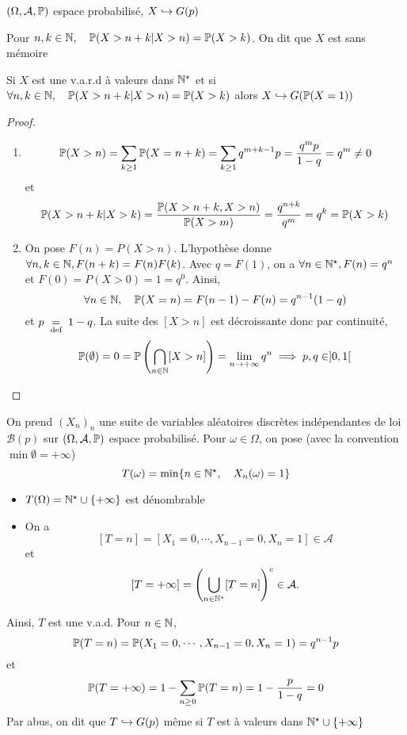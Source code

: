 \begin{thm}
    \Hyp $(\Omega, \mathcal A, \P)$ espace probabilisé, $X\suit G(p)$
     \begin{concenum}
     \item Pour $n,k\in \N,\quad \P(X>n+k|X>n)=\P(X>k)$. On dit que $X$ est sans mémoire
     \item Si $X$ est une v.a.r.d à valeurs dans $\N^\star$ et si $\forall  n,k\in \N,\quad \P(X>n+k|X>n)=\P(X>k)$ alors $X\suit G(\P(X=1))$
    \end{concenum}
\end{thm}

\begin{proof}~
\begin{enumerate}
    \item \[
            \P(X>n)=\sum_{k\geq 1}\P(X=n+k)=\sum_{k\geq 1}q^{m+k-1}p= \frac{q^mp}{1-q}=q^m \neq 0
    \] et \[
    \P(X>n+k|X>k)= \frac{\P(X>n+k,X>n)}{\P(X>m)}=\frac{q^{n+k}}{q^m}=q^k=\P(X>k)
    \] 
\item On pose $F(n)=P(X>n)$. L'hypothèse donne  $\forall  n,k \in  \N, F(n+k)=F(n)F(k)$. Avec $q=F(1)$, on a  $\forall  n\in \N^\star, F(n)=q^n$ et $F(0)=P(X>0)=1=q^0$. Ainsi,  \[
        \forall  n\in \N,\quad \P(X=n)=F(n-1)-F(n)=q^{n-1}(1-q)
\] 
et $p\defeq1-q$. La suite des $[X>n]$ est décroissante donc par continuité,  \[
    \P(\emptyset)=0=\P \left( \bigcap_{n \in  \N} [X>n] \right) =\lim_{n\to+\infty}q^n\implies p,q\in ]0,1[
\] 
\end{enumerate}
\end{proof}

\begin{rem}
    On prend $(X_n)_n$ une suite de variables aléatoires discrètes indépendantes de loi $\mathcal  B(p)$ sur $(\Omega, \mathcal A, \P)$ espace probabilisé. Pour $\omega \in  \Omega$, on pose (avec la convention $\min \emptyset=+\infty$)\[
        T(\omega)=\min \{n\in  \N^\star,\quad X_n(\omega)=1\} 
    \]
    \begin{itemize}
        \item $T(\Omega)=\N^\star\cup \{+\infty\} $ est dénombrable
        \item On a \[
                [T=n]=[X_1=0,\cdots ,X_{n-1}=0,X_n=1]\in \mathcal  A
        \] 
        et \[
            [T=+\infty]= \left( \bigcup_{n\in \N^\star}[T=n]  \right)^c\in \mathcal  A.
        \] 
    \end{itemize}
    Ainsi, $T$ est une v.a.d. Pour $n\in \N$, \[
        \P(T=n)=\P(X_1=0,\cdots ,X_{n-1}=0,X_n=1)=q^{n-1}p
    \] 
    et \[
        \P(T=+\infty)=1-\sum_{n\geq 0}\P(T=n)=1-\frac{p}{1-q}=0
    \] 
    Par abus, on dit que $T\suit G(p)$ même si  $T$ est à valeurs dans $\N^\star\cup \{+\infty\} $
\end{rem}

